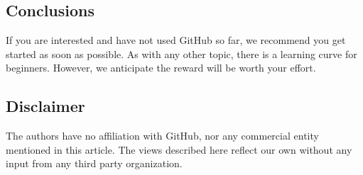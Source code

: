\documentclass[10pt,letterpaper]{article}
\begin{document}
\subsection*{Conclusions}\label{conclusions}

If you are interested and have not used GitHub so far, we recommend you
get started as soon as possible. As with any other topic, there is a learning
curve for beginners. However, we anticipate the reward will
be worth your effort.

\subsection*{Disclaimer}\label{disclaimer}

The authors have no affiliation with GitHub, nor any commercial entity
mentioned in this article. The views described here reflect our own
without any input from any third party organization.

\nolinenumbers

 
\end{document}
